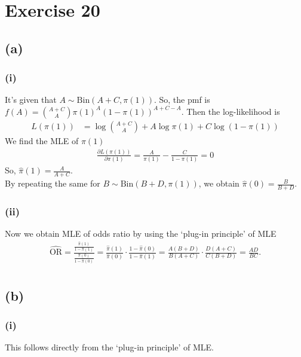 \section*{Exercise 20}
\subsection*{(a)}

\subsubsection*{(i)}
It's given that $A \sim \mathrm{Bin}(A+C,\pi(1))$. So, the pmf is $f(A) = \binom{A+C}{A}\pi(1)^{A} (1-\pi(1))^{A+C-A}$. Then the log-likelihood is
\begin{align*}
L(\pi(1)) &= \log\binom{A+C}{A} + A\log\pi(1) + C\log(1-\pi(1))
\end{align*}
We find the MLE of $\pi(1)$
\begin{align*}
\frac{\partial L(\pi(1))}{\partial \pi(1)} = \frac{A}{\pi(1)} -\frac{C}{1-\pi(1)} = 0
\end{align*}
So, $\widehat{\pi}(1) = \frac{A}{A+C}$.\\

By repeating the same for $B \sim \mathrm{Bin}(B+D,\pi(1))$, we obtain $\widehat{\pi}(0) = \frac{B}{B+D}$.\\


\subsubsection*{(ii)}
Now we obtain MLE of odds ratio by using the `plug-in principle' of MLE
\begin{align*}
\widehat{\mathrm{OR}} = \frac{\frac{\widehat{\pi}(1)}{1-\widehat{\pi}(1)}}{\frac{\widehat{\pi}(0)}{1-\widehat{\pi}(0)}} = \frac{\widehat{\pi}(1)}{\widehat{\pi}(0)} \cdot \frac{1-\widehat{\pi}(0)}{1-\widehat{\pi}(1)} = \frac{A(B+D)}{B(A+C)}\cdot\frac{D(A+C)}{C(B+D)} = \frac{AD}{BC}.\\
\end{align*}

\vspace{\baselineskip}
\subsection*{(b)}

\subsubsection*{(i)}
This follows directly from the `plug-in principle' of MLE.


